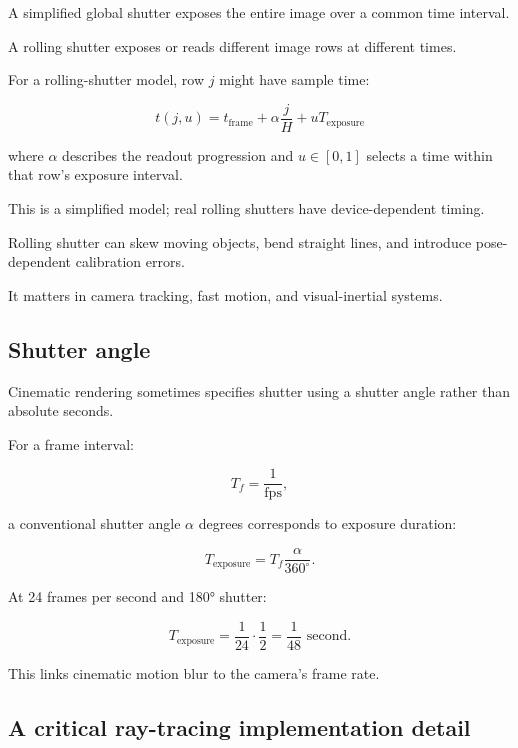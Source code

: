 \hypertarget{02-foundations-ii-ch036-global-shutter-versus-rolling-shutter}{}

A simplified global shutter exposes the entire image over a common time interval.

A rolling shutter exposes or reads different image rows at different times.

For a rolling-shutter model, row \(j\) might have sample time:

\[ \boxed{ t(j,u)= t_{\mathrm{frame}} +\alpha\frac jH +uT_{\mathrm{exposure}} } \]

where \(\alpha\) describes the readout progression and \(u\in[0,1]\) selects a time within that row's exposure interval.

This is a simplified model; real rolling shutters have device-dependent timing.

Rolling shutter can skew moving objects, bend straight lines, and introduce pose-dependent calibration errors.

It matters in camera tracking, fast motion, and visual-inertial systems.

\subsection{Shutter angle}\label{02-foundations-ii-ch036-shutter-angle}

\hypertarget{02-foundations-ii-ch036-shutter-angle}{}

Cinematic rendering sometimes specifies shutter using a shutter angle rather than absolute seconds.

For a frame interval:

\[ T_f=\frac1{\mathrm{fps}}, \]

a conventional shutter angle \(\alpha\) degrees corresponds to exposure duration:

\[ \boxed{ T_{\mathrm{exposure}} = T_f\frac{\alpha}{360^\circ}. } \]

At 24 frames per second and 180° shutter:

\[ T_{\mathrm{exposure}} = \frac1{24}\cdot\frac12 = \boxed{\frac1{48}\text{ second}}. \]

This links cinematic motion blur to the camera's frame rate.

\subsection{A critical ray-tracing implementation detail}\label{02-foundations-ii-ch036-a-critical-ray-tracing-implementation-detail}

